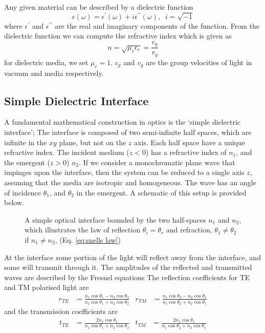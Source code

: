 \documentclass[10pt,a4paper,portrait]{report}
\begin{document}
\noindent Any given material can be described by a dielectric function 
\begin{equation}
\epsilon(\omega) = \epsilon^{\prime} (\omega) + i \epsilon^{\prime\prime} (\omega), \;\; i = \sqrt{-1}
\end{equation}
where $\epsilon^{\prime}$ and $\epsilon^{\prime\prime}$ are the real and imaginary components of the function.
From the dielectric function we can compute the refractive index which is given as 
\begin{equation}
n = \sqrt{\mu_r \epsilon_r} = \frac{c_g}{v_g}
\end{equation}
for dielectric media, we set $\mu_r = 1$. $c_g$ and $v_g$ are the group velocities of light in vacuum and media respectively.

\subsection{Simple Dielectric Interface}\label{sec:simple-dielectric-interface}

A fundamental mathematical construction in optics is the `simple dielectric interface'; The interface is composed of two semi-infinite half spaces, which are infinite in the $xy$ plane, but not on the $z$ axis.
Each half space have a unique refractive index. The incident medium ($z<0$) has a refractive index of $n_1$, and the emergent ($z>0$) $n_2$. 
If we consider a monochromatic plane wave that impinges upon the interface, then the system can be reduced to a single axis $z$, assuming that the media are isotropic and homogeneous. The wave has an angle of incidence $\theta_1$, and $\theta_2$ in the emergent. A schematic of this setup is provided below.

\begin{figure}[H]
\begin{center}
\centering
\def\svgwidth{3in}

\end{center}
\label{simple-dielectric-interface}
\caption{A simple optical interface bounded by the two half-spaces $n_1$ and $n_2$, which illustrates the law of reflection $\theta_i=\theta_r$ and refraction, $\theta_1\neq\theta_2$ if $n_1 \neq n_2$, (Eq. \ref{eq:snells law})}
\end{figure}

At the interface some portion of the light will reflect away from the interface, and some will transmit through it.
The amplitudes of the reflected and transmitted waves are described by the Fresnel equations
The reflection coefficients for TE and TM polarised light are
\begin{align}
\label{fresnel-reflectance-coeff}
r_{TE} &= \frac{ n_1 \cos \theta_1 - n_2 \cos \theta_2}{n_1 \cos \theta_1 + n_2 \cos \theta_2} &
r_{TM} &= \frac{ n_1 \cos \theta_2 - n_2 \cos \theta_1 }{ n_1 \cos \theta_2 + n_2 \cos \theta_1} 
\end{align}
and the transmission coefficients are
\begin{align}
\label{fresnel-transmission-coeff}
t_{TE} &= \frac{ 2 n_1 \cos \theta_1 }{n_1 \cos \theta_1 + n_2 \cos \theta_2} &
t_{TM} &= \frac{ 2 n_1 \cos \theta_1 }{ n_1 \cos \theta_2 + n_2 \cos \theta_1}
\end{align}
\end{document}

